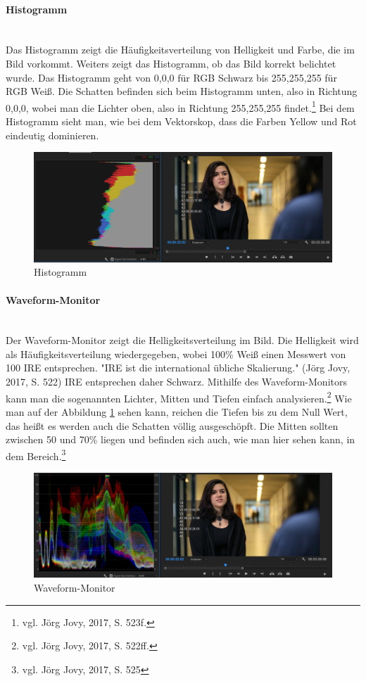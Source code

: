 \paragraph{Histogramm}
\leavevmode \\
Das Histogramm zeigt die Häufigkeitsverteilung von Helligkeit und Farbe, die im Bild vorkommt. Weiters zeigt das Histogramm, ob das Bild korrekt belichtet wurde. Das Histogramm geht von 0,0,0 für RGB Schwarz bis 255,255,255 für RGB Weiß. Die Schatten befinden sich beim Histogramm unten, also in Richtung 0,0,0, wobei man die Lichter oben, also in Richtung 255,255,255 findet.\footnote{vgl. Jörg Jovy, 2017, S. 523f.}\newline
Bei dem Histogramm sieht man, wie bei dem Vektorskop, dass die Farben Yellow und Rot eindeutig dominieren. 
\begin{figure}[H]
	\centering
	\includegraphics[width=1.0\textwidth]{abb21} 
	\caption{Histogramm}
\end{figure}
\paragraph{Waveform-Monitor}
\leavevmode \\
Der Waveform-Monitor zeigt die Helligkeitsverteilung im Bild. Die Helligkeit wird als Häufigkeitsverteilung wiedergegeben, wobei 100\% Weiß einen Messwert von 100 IRE entsprechen. "IRE ist die international übliche Skalierung." (Jörg Jovy, 2017, S. 522) IRE entsprechen daher Schwarz. Mithilfe des Waveform-Monitors kann man die sogenannten Lichter, Mitten und Tiefen einfach analysieren.\footnote{vgl. Jörg Jovy, 2017, S. 522ff.}\newline
Wie man auf der Abbildung \ref{fig:abb20} sehen kann, reichen die Tiefen bis zu dem Null Wert, das heißt es werden auch die Schatten völlig ausgeschöpft. Die Mitten sollten zwischen 50 und 70\% liegen und befinden sich auch, wie man hier sehen kann, in dem Bereich.\footnote{vgl. Jörg Jovy, 2017, S. 525}
\begin{figure}[H]
	\centering
	\includegraphics[width=1.0\textwidth]{abb20} 
	\caption{Waveform-Monitor}\label{fig:abb20}
\end{figure}
